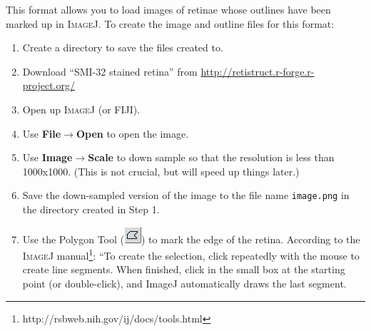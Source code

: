 \documentclass{article}
\begin{document}
This format allows you to load images of retinae whose outlines have
been marked up in \textsc{ImageJ}. To create the image and outline
files for this format:
\begin{enumerate}
\item Create a directory to save the files created to.
\item Download ``SMI-32 stained retina'' from
  \url{http://retistruct.r-forge.r-project.org/}
\item Open up \textsc{ImageJ} (or FIJI).
\item Use \textbf{File$\rightarrow$Open} to open the image.
\item Use \textbf{Image$\rightarrow$Scale} to down sample so that the
  resolution is less than 1000x1000. (This is not crucial, but will
  speed up things later.)
\item Save the down-sampled version of the image to the file name
  \texttt{image.png} in the directory created in Step 1.
\item Use the Polygon Tool
  (\includegraphics[height=\baselineskip]{poly}) to mark the edge of
  the retina. According to the \textsc{ImageJ}
  manual\footnote{http://rsbweb.nih.gov/ij/docs/tools.html}: ``To
  create the selection, click repeatedly with the mouse to create line
  segments. When finished, click in the small box at the starting
  point (or double-click), and ImageJ automatically draws the last
  segment.


\end{enumerate}
\end{document}
